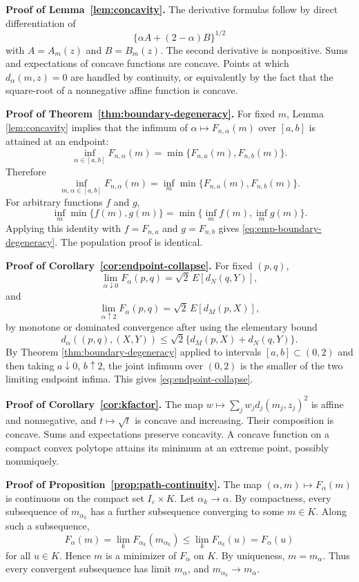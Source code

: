 \documentclass[11pt]{article}
\newcommand{\eps}{\varepsilon}
\newcommand{\1}{\mathbf{1}}
\begin{document}
\medskip 
\noindent \textbf{Proof of Lemma~\ref{lem:concavity}.}
The derivative formulas follow by direct differentiation of
\[
 \{\alpha A+(2-\alpha)B\}^{1/2}
\]
with $A=A_m(z)$ and $B=B_m(z)$.  The second derivative is nonpositive.  Sums and expectations of concave functions are concave.  Points at which $d_\alpha(m,z)=0$ are handled by continuity, or equivalently by the fact that the square-root of a nonnegative affine function is concave.

\medskip
\noindent \textbf{Proof of Theorem~\ref{thm:boundary-degeneracy}.}
For fixed $m$, Lemma \ref{lem:concavity} implies that the infimum of $\alpha\mapsto F_{n,\alpha}(m)$ over $[a,b]$ is attained at an endpoint:
\[
 \inf_{\alpha\in[a,b]}F_{n,\alpha}(m)=\min\{F_{n,a}(m),F_{n,b}(m)\}.
\]
Therefore
\[
 \inf_{m,\alpha\in[a,b]}F_{n,\alpha}(m)
 =\inf_m\min\{F_{n,a}(m),F_{n,b}(m)\}.
\]
For arbitrary functions $f$ and $g$,
\[
 \inf_m\min\{f(m),g(m)\}
 =\min\{\inf_m f(m),\inf_m g(m)\}.
\]
Applying this identity with $f=F_{n,a}$ and $g=F_{n,b}$ gives \eqref{eq:emp-boundary-degeneracy}.  The population proof is identical.


\medskip 
\noindent \textbf{Proof of Corollary~\ref{cor:endpoint-collapse}.}
For fixed $(p,q)$,
\[
 \lim_{\alpha\downarrow0}F_\alpha(p,q)=\sqrt2\,E[d_N(q,Y)],
\]
and
\[
 \lim_{\alpha\uparrow2}F_\alpha(p,q)=\sqrt2\,E[d_M(p,X)],
\]
by monotone or dominated convergence after using the elementary bound
\[
 d_\alpha((p,q),(X,Y))\le \sqrt2\{d_M(p,X)+d_N(q,Y)\}.
\]
By Theorem \ref{thm:boundary-degeneracy} applied to intervals $[a,b]\subset(0,2)$ and then taking $a\downarrow0$, $b\uparrow2$, the joint infimum over $(0,2)$ is the smaller of the two limiting endpoint infima.  This gives \eqref{eq:endpoint-collapse}.

\medskip 
\noindent \textbf{Proof of Corollary~\ref{cor:kfactor}.}
The map $w\mapsto \sum_jw_jd_j(m_j,z_j)^2$ is affine and nonnegative, and $t\mapsto\sqrt t$ is concave and increasing.  Their composition is concave.  Sums and expectations preserve concavity.  A concave function on a compact convex polytope attains its minimum at an extreme point, possibly nonuniquely.

\medskip 
\noindent \textbf{Proof of Proposition~\ref{prop:path-continuity}.}
The map $(\alpha,m)\mapsto F_\alpha(m)$ is continuous on the compact set $I_\eps\times K$.  Let $\alpha_k\to\alpha$.  By compactness, every subsequence of $m_{\alpha_k}$ has a further subsequence converging to some $m\in K$.  Along such a subsequence,
\[
 F_\alpha(m)=\lim_kF_{\alpha_k}(m_{\alpha_k})
 \le \lim_kF_{\alpha_k}(u)=F_\alpha(u)
\]
for all $u\in K$.  Hence $m$ is a minimizer of $F_\alpha$ on $K$.  By uniqueness, $m=m_\alpha$.  Thus every convergent subsequence has limit $m_\alpha$, and $m_{\alpha_k}\to m_\alpha$.
\end{document}
